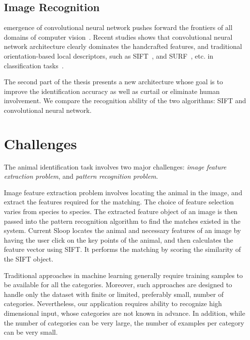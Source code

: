 \subsection{Image Recognition} %
emergence of convolutional neural network pushes forward the frontiers of all
domains of computer vision~\cite{lecun95}. Recent studies shows that
convolutional neural network architecture clearly dominates the handcrafted
features, and traditional orientation-based local descriptors, such as
SIFT~\cite{lowe04}, and SURF~\cite{surf08}, etc. in classification
tasks~\cite{fisher14,kriz12,prelu15,ILSVRC15}.

The second part of the thesis presents a new architecture whose goal is to
improve the identification accuracy as well as curtail or eliminate human
involvement. We compare the recognition ability of the two algorithms: SIFT and
convolutional neural network. 

\section{Challenges}

The animal identification task involves two major challenges: \emph{image
feature extraction problem}, and \emph{pattern recognition problem}. 

Image feature extraction problem involves locating the animal in the image, and
extract the features required for the matching. The choice of feature selection
varies from species to species. The extracted feature object of an image is then
passed into the pattern recognition algorithm to find the matches existed in the
system. Current Sloop locates the animal and necessary features of an image by
having the user click on the key points of the animal, and then calculates the
feature vector using SIFT. It performs the matching by scoring the similarity of
the SIFT object. 

Traditional approaches in machine learning generally require training samples to
be available for all the categories. Moreover, such approaches are designed to
handle only the dataset with finite or limited, preferably small, number of
categories. Nevertheless, our application requires ability to recognize high
dimensional input, whose categories are not known in advance. In addition, while
the number of categories can be very large, the number of examples per category
can be very small.
